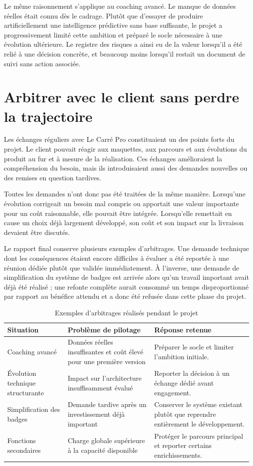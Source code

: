 Le même raisonnement s'applique au coaching avancé. Le manque de données réelles était connu dès le cadrage. Plutôt que d'essayer de produire artificiellement une intelligence prédictive sans base suffisante, le projet a progressivement limité cette ambition et préparé le socle nécessaire à une évolution ultérieure. Le registre des risques a ainsi eu de la valeur lorsqu'il a été relié à une décision concrète, et beaucoup moins lorsqu'il restait un document de suivi sans action associée.

\section{Arbitrer avec le client sans perdre la trajectoire}

Les échanges réguliers avec Le Carré Pro constituaient un des points forts du projet. Le client pouvait réagir aux maquettes, aux parcours et aux évolutions du produit au fur et à mesure de la réalisation. Ces échanges amélioraient la compréhension du besoin, mais ils introduisaient aussi des demandes nouvelles ou des remises en question tardives.

Toutes les demandes n'ont donc pas été traitées de la même manière. Lorsqu'une évolution corrigeait un besoin mal compris ou apportait une valeur importante pour un coût raisonnable, elle pouvait être intégrée. Lorsqu'elle remettait en cause un choix déjà largement développé, son coût et son impact sur la livraison devaient être discutés.

Le rapport final conserve plusieurs exemples d'arbitrages. Une demande technique dont les conséquences étaient encore difficiles à évaluer a été reportée à une réunion dédiée plutôt que validée immédiatement. À l'inverse, une demande de simplification du système de badges est arrivée alors qu'un travail important avait déjà été réalisé ; une refonte complète aurait consommé un temps disproportionné par rapport au bénéfice attendu et a donc été refusée dans cette phase du projet.

\begin{table}[H]
\centering
\begin{tabular}{p{4cm} p{5cm} p{4.8cm}}
\toprule
\textbf{Situation} & \textbf{Problème de pilotage} & \textbf{Réponse retenue} \\
\midrule
Coaching avancé & Données réelles insuffisantes et coût élevé pour une première version & Préparer le socle et limiter l'ambition initiale. \\
Évolution technique structurante & Impact sur l'architecture insuffisamment évalué & Reporter la décision à un échange dédié avant engagement. \\
Simplification des badges & Demande tardive après un investissement déjà important & Conserver le système existant plutôt que reprendre entièrement le développement. \\
Fonctions secondaires & Charge globale supérieure à la capacité disponible & Protéger le parcours principal et reporter certains enrichissements. \\
\bottomrule
\end{tabular}
\caption{Exemples d'arbitrages réalisés pendant le projet}
\label{tab:lynx-arbitrages}
\end{table}

